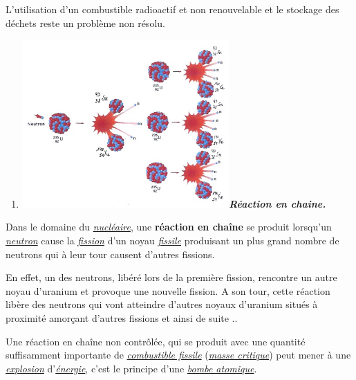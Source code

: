 L'utilisation d'un combustible radioactif et non renouvelable et le
stockage des déchets reste un problème non résolu.

\begin{enumerate}
\def\labelenumi{\alph{enumi})}
\tightlist
\item
  \includegraphics[width=7.925cm,height=6.421cm]{Pictures/1000000100000234000001C99805E06609697748.png}\emph{\textbf{Réaction
  en chaine. }}
\end{enumerate}

Dans le domaine du
\href{https://fr.wikipedia.org/wiki/Nucl\%C3\%A9aire}{\emph{\emph{nucléaire}}},
une \textbf{réaction en chaîne} se produit lorsqu'un
\href{https://fr.wikipedia.org/wiki/Neutron}{\emph{\emph{neutron}}}
cause la
\href{https://fr.wikipedia.org/wiki/Fission}{\emph{\emph{fission}}} d'un
noyau
\href{https://fr.wikipedia.org/wiki/Fissile}{\emph{\emph{fissile}}}
produisant un plus grand nombre de neutrons qui à leur tour causent
d'autres fissions.

En effet, un des neutrons, libéré lors de la première fission, rencontre
un autre noyau d'uranium et provoque une nouvelle fission. A son tour,
cette réaction libère des neutrons qui vont atteindre d'autres noyaux
d'uranium situés à proximité amorçant d'autres fissions et ainsi de
suite ..

Une réaction en chaîne non contrôlée, qui se produit avec une quantité
suffisamment importante de
\href{https://fr.wikipedia.org/wiki/Combustible_nucl\%C3\%A9aire}{\emph{\emph{combustible
fissile}}}
(\href{https://fr.wikipedia.org/wiki/Masse_critique_(r\%C3\%A9action_nucl\%C3\%A9aire)}{\emph{\emph{masse
critique}}}) peut mener à une
\href{https://fr.wikipedia.org/wiki/Explosion}{\emph{\emph{explosion}}}
d'\href{https://fr.wikipedia.org/wiki/\%C3\%89nergie}{\emph{\emph{énergie}}},
c'est le principe d'une
\href{https://fr.wikipedia.org/wiki/Bombe_A}{\emph{\emph{bombe
atomique}}}.

